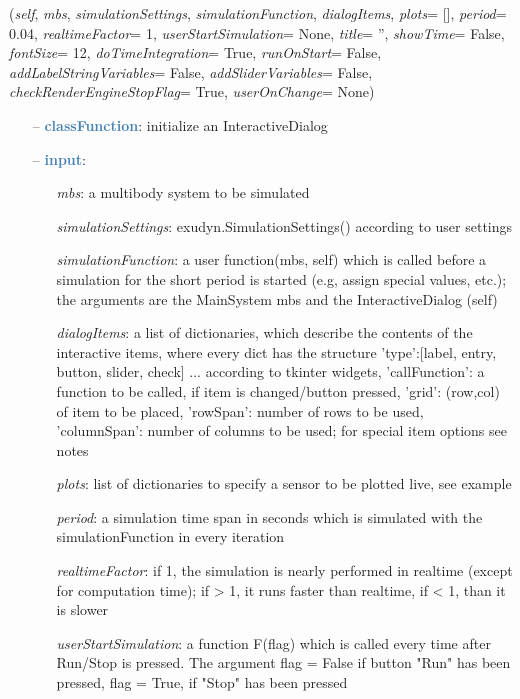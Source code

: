 \begin{itemize}[leftmargin=1.4cm]
\begin{itemize}[leftmargin=1.4cm]
\begin{itemize}[leftmargin=0.5cm]
\begin{itemize}[leftmargin=1.4cm]
\begin{itemize}[leftmargin=1.4cm]
\begin{itemize}[leftmargin=0.5cm]
\begin{itemize}[leftmargin=1.4cm]
\begin{itemize}[leftmargin=0.5cm]
\begin{itemize}[leftmargin=1.4cm]
\begin{itemize}[leftmargin=1.4cm]
\begin{flushleft}
({\it self}, {\it mbs}, {\it simulationSettings}, {\it simulationFunction}, {\it dialogItems}, {\it plots}= [], {\it period}= 0.04, {\it realtimeFactor}= 1, {\it userStartSimulation}= None, {\it title}= '', {\it showTime}= False, {\it fontSize}= 12, {\it doTimeIntegration}= True, {\it runOnStart}= False, {\it addLabelStringVariables}= False, {\it addSliderVariables}= False, {\it checkRenderEngineStopFlag}= True, {\it userOnChange}= None)
\end{flushleft}
\setlength{\itemindent}{0.7cm}
\begin{itemize}[leftmargin=0.7cm]
\item[--]\textcolor{steelblue}{\bf classFunction}: initialize an InteractiveDialog
\item[--]\textcolor{steelblue}{\bf input}: \vspace{-6pt}
\begin{itemize}[leftmargin=1.2cm]
\setlength{\itemindent}{-0.7cm}
\item[]{\it mbs}: a multibody system to be simulated
\item[]{\it simulationSettings}: exudyn.SimulationSettings() according to user settings
\item[]{\it simulationFunction}: a user function(mbs, self) which is called before a simulation for the short period is started (e.g, assign special values, etc.); the arguments are the MainSystem mbs and the InteractiveDialog (self)
\item[]{\it dialogItems}: a list of dictionaries, which describe the contents of the interactive items, where every dict has the structure {'type':[label, entry, button, slider, check] ... according to tkinter widgets, 'callFunction': a function to be called, if item is changed/button pressed, 'grid': (row,col) of item to be placed, 'rowSpan': number of rows to be used, 'columnSpan': number of columns to be used; for special item options see notes}
\item[]{\it plots}: list of dictionaries to specify a sensor to be plotted live, see example
\item[]{\it period}: a simulation time span in seconds which is simulated with the simulationFunction in every iteration
\item[]{\it realtimeFactor}: if 1, the simulation is nearly performed in realtime (except for computation time); if > 1, it runs faster than realtime, if < 1, than it is slower
\item[]{\it userStartSimulation}: a function F(flag) which is called every time after Run/Stop is pressed. The argument flag = False if button "Run" has been pressed, flag = True, if "Stop" has been pressed

\end{itemize}
\end{itemize}
\end{itemize}
\end{itemize}
\end{itemize}
\end{itemize}
\end{itemize}
\end{itemize}
\end{itemize}
\end{itemize}
\end{itemize}
\end{itemize}
